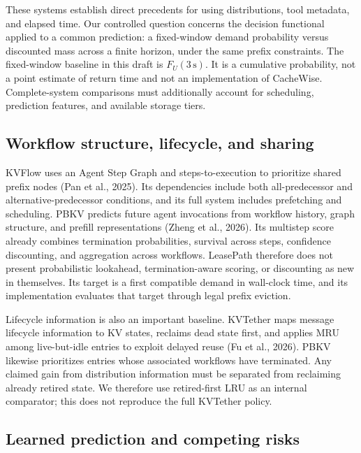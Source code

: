 \documentclass[sigconf, screen, review, balance=false]{acmart}
\begin{document}
These systems establish direct precedents for using distributions, tool
metadata, and elapsed time. Our controlled question concerns the
decision functional applied to a common prediction: a fixed-window
demand probability versus discounted mass across a finite horizon, under
the same prefix constraints. The fixed-window baseline in this draft is
\(F_U(3\,\mathrm{s})\). It is a cumulative probability, not a point
estimate of return time and not an implementation of CacheWise.
Complete-system comparisons must additionally account for scheduling,
prediction features, and available storage tiers.

\subsection{Workflow structure, lifecycle, and
sharing}\label{workflow-structure-lifecycle-and-sharing}

KVFlow uses an Agent Step Graph and steps-to-execution to prioritize
shared prefix nodes (Pan et al., 2025). Its dependencies include both
all-predecessor and alternative-predecessor conditions, and its full
system includes prefetching and scheduling. PBKV predicts future agent
invocations from workflow history, graph structure, and prefill
representations (Zheng et al., 2026). Its multistep score already
combines termination probabilities, survival across steps, confidence
discounting, and aggregation across workflows. LeasePath therefore does
not present probabilistic lookahead, termination-aware scoring, or
discounting as new in themselves. Its target is a first compatible
demand in wall-clock time, and its implementation evaluates that target
through legal prefix eviction.

Lifecycle information is also an important baseline. KVTether maps
message lifecycle information to KV states, reclaims dead state first,
and applies MRU among live-but-idle entries to exploit delayed reuse (Fu
et al., 2026). PBKV likewise prioritizes entries whose associated
workflows have terminated. Any claimed gain from distribution
information must be separated from reclaiming already retired state. We
therefore use retired-first LRU as an internal comparator; this does not
reproduce the full KVTether policy.

\subsection{Learned prediction and competing
risks}\label{learned-prediction-and-competing-risks}
\end{document}
